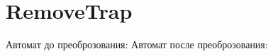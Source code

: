 \section{RemoveTrap}
\begin{frame}{}
	Автомат до преоброзования:
	Автомат после преоброзования:
\end{frame}
